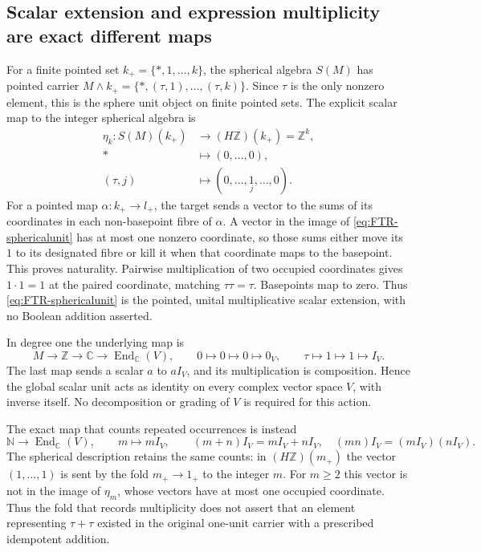 \subsection{Scalar extension and expression multiplicity are exact different maps}

For a finite pointed set $k_+=\{*,1,\ldots,k\}$, the spherical
algebra $S(M)$ has pointed carrier
$M\wedge k_+=\{*,(\tau,1),\ldots,(\tau,k)\}$.
Since $\tau$ is the only nonzero element, this is the sphere
unit object on finite pointed sets. The explicit scalar map to
the integer spherical algebra is
\begin{equation}\tag{FTR1}\label{eq:FTR-sphericalunit}
 \begin{aligned}
 \eta_k:S(M)(k_+)&\longrightarrow(H\mathbb Z)(k_+)=\mathbb Z^k,\\
 *&\longmapsto(0,\ldots,0),\\
 (\tau,j)&\longmapsto(0,\ldots,\underset{j}{1},\ldots,0).
 \end{aligned}
\end{equation}
For a pointed map $\alpha:k_+\to l_+$, the target sends a vector
to the sums of its coordinates in each non-basepoint fibre of
$\alpha$. A vector in the image of \eqref{eq:FTR-sphericalunit}
has at most one nonzero coordinate, so those sums either move its
$1$ to its designated fibre or kill it when that coordinate maps
to the basepoint. This proves naturality. Pairwise multiplication
of two occupied coordinates gives $1\cdot1=1$ at the paired
coordinate, matching $\tau\tau=\tau$. Basepoints map to zero.
Thus \eqref{eq:FTR-sphericalunit} is the pointed, unital
multiplicative scalar extension, with no Boolean addition asserted.

In degree one the underlying map is
\begin{equation}\tag{FTR2}\label{eq:FTR-unitaction}
 M\longrightarrow\mathbb Z\longrightarrow\mathbb C
       \longrightarrow\operatorname{End}_{\mathbb C}(V),
 \qquad0\longmapsto0\longmapsto0\longmapsto0_V,
 \qquad\tau\longmapsto1\longmapsto1\longmapsto I_V.
\end{equation}
The last map sends a scalar $a$ to $aI_V$, and its multiplication
is composition. Hence the global scalar unit acts as identity on
every complex vector space $V$, with inverse itself.
No decomposition or grading of $V$ is required for this action.

The exact map that counts repeated occurrences is instead
\begin{equation}\tag{FTR3}\label{eq:FTR-countaction}
 \mathbb N\longrightarrow\operatorname{End}_{\mathbb C}(V),
       \qquad m\longmapsto mI_V,
 \qquad (m+n)I_V=mI_V+nI_V,\quad
       (mn)I_V=(mI_V)(nI_V).
\end{equation}
The spherical description retains the same counts: in
$(H\mathbb Z)(m_+)$ the vector $(1,\ldots,1)$ is sent by the
fold $m_+\to1_+$ to the integer $m$.
For $m\geq2$ this vector is not in the image of
$\eta_m$, whose vectors have at most one occupied coordinate.
Thus the fold that records multiplicity does not assert that an
element representing $\tau+\tau$ existed in the original
one-unit carrier with a prescribed idempotent addition.

